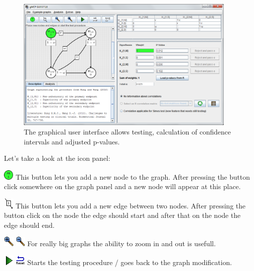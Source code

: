 \documentclass[a4paper, 10pt]{article}\usepackage[]{graphicx}\usepackage[]{color}
\numberwithin{equation}{section}
\theoremstyle{definition}
\theoremstyle{plain}
\begin{document}
\begin{figure}[ht]
  \centering    
  \includegraphics[width=0.95\textwidth]{pictures/FullFeaturedGUI.png}      
  \caption{\label{fig:fullGUI} The graphical user interface allows testing, calculation of confidence intervals and adjusted p-values.}
\end{figure}

Let's take a look at the icon panel:

\includegraphics[width=0.5cm]{pictures/vertex.png} This button lets
you add a new node to the graph.  After pressing the button click
somewhere on the graph panel and a new node will appear at this place.

\includegraphics[width=0.5cm]{pictures/edge.png} This button lets you
add a new edge between two nodes.  After pressing the button click on
the node the edge should start and after that on the node the edge
should end.

\includegraphics[width=0.5cm]{pictures/zoom_in.png}
\includegraphics[width=0.5cm]{pictures/zoom_out.png} For really big
graphs the ability to zoom in and out is usefull.

\includegraphics[width=0.5cm]{pictures/StartTesting.png}
\includegraphics[width=0.5cm]{pictures/Reset.png} Starts the testing
procedure / goes back to the graph modification.
\end{document}
